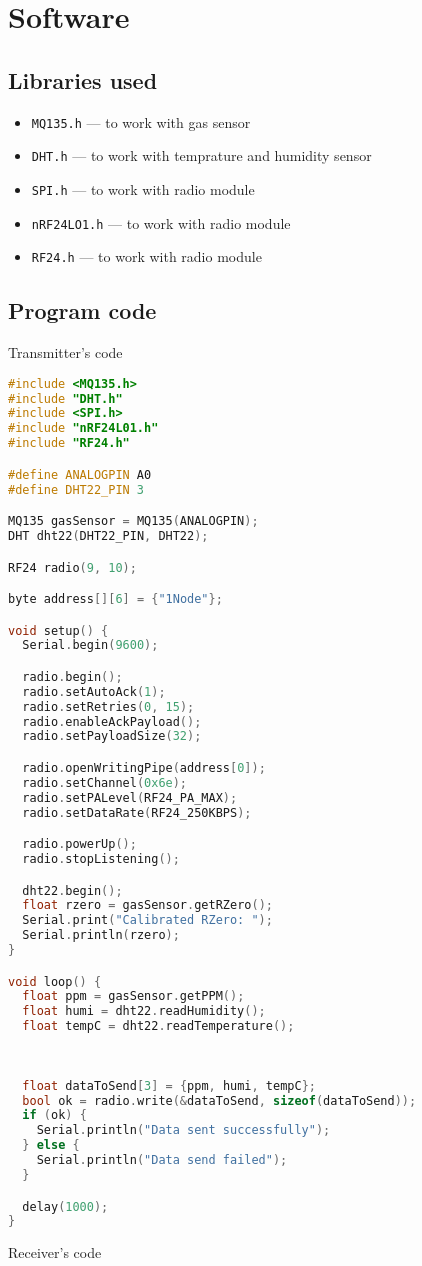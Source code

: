 \documentclass[a4paper,12pt]{article}
\begin{document}
\section{Software}
\subsection{Libraries used}
\begin{itemize}
    \item \texttt{MQ135.h} — to work with gas sensor
    \item \texttt{DHT.h} — to work with temprature and humidity sensor
    \item \texttt{SPI.h} — to work with radio module
    \item \texttt{nRF24LO1.h} — to work with radio module
    \item \texttt{RF24.h} — to work with radio module
\end{itemize}

\subsection{Program code}
Transmitter's code

\begin{lstlisting}[language=C++, caption=Weather meteostation transmitter's code]
#include <MQ135.h>
#include "DHT.h"
#include <SPI.h>
#include "nRF24L01.h"
#include "RF24.h"

#define ANALOGPIN A0  
#define DHT22_PIN 3

MQ135 gasSensor = MQ135(ANALOGPIN); 
DHT dht22(DHT22_PIN, DHT22);

RF24 radio(9, 10); 

byte address[][6] = {"1Node"};

void setup() {
  Serial.begin(9600);

  radio.begin();
  radio.setAutoAck(1);
  radio.setRetries(0, 15);
  radio.enableAckPayload();
  radio.setPayloadSize(32);

  radio.openWritingPipe(address[0]);
  radio.setChannel(0x6e);
  radio.setPALevel(RF24_PA_MAX);
  radio.setDataRate(RF24_250KBPS); 

  radio.powerUp();
  radio.stopListening();

  dht22.begin();
  float rzero = gasSensor.getRZero();
  Serial.print("Calibrated RZero: ");
  Serial.println(rzero);
}

void loop() {
  float ppm = gasSensor.getPPM();
  float humi = dht22.readHumidity();
  float tempC = dht22.readTemperature();
  
  
  
  float dataToSend[3] = {ppm, humi, tempC};
  bool ok = radio.write(&dataToSend, sizeof(dataToSend));
  if (ok) {
    Serial.println("Data sent successfully");
  } else {
    Serial.println("Data send failed");
  }

  delay(1000);
}
\end{lstlisting}
Receiver's code
\end{document}
